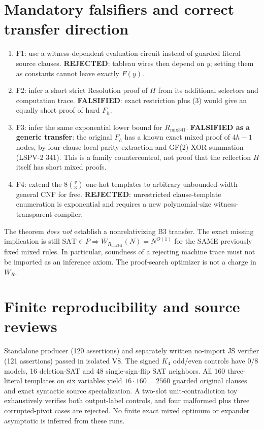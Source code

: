 \documentclass[11pt]{article}
\begin{document}
\section*{Mandatory falsifiers and correct transfer direction}
\begin{enumerate}
\item[] F1: use a witness-dependent evaluation circuit instead of guarded literal source clauses. \textbf{REJECTED}: tableau wires then depend on \(y\); setting them as constants cannot leave exactly \(F(y)\).
\item[] F2: infer a short strict Resolution proof of \(H\) from its additional selectors and computation trace. \textbf{FALSIFIED}: exact restriction plus (3) would give an equally short proof of hard \(F_h\).
\item[] F3: infer the same exponential lower bound for \(R_{\mathrm{mix341}}\). \textbf{FALSIFIED as a generic transfer}: the original \(F_h\) has a known exact mixed proof of \(4h-1\) nodes, by four-clause local parity extraction and GF(2) XOR summation (LSPV-2 341). This is a family countercontrol, not proof that the reflection \(H\) itself has short mixed proofs.
\item[] F4: extend the \(8\binom v3\) one-hot templates to arbitrary unbounded-width general CNF for free. \textbf{REJECTED}: unrestricted clause-template enumeration is exponential and requires a new polynomial-size witness-transparent compiler.
\end{enumerate}
The theorem \emph{does not} establish a nonrelativizing B3 transfer. The exact missing implication is still \(\mathrm{SAT}\in P\Rightarrow\overline W_{R_{\mathrm{mix341}}}(N)=N^{O(1)}\) for the SAME previously fixed mixed rules. In particular, soundness of a rejecting machine trace must not be imported as an inference axiom. The proof-search optimizer is not a charge in \(W_R\).

\section*{Finite reproducibility and source reviews}
Standalone producer (120 assertions) and separately written no-import JS verifier (121 assertions) passed in isolated V8. The signed \(K_4\) odd/even controls have 0/8 models, 16 deletion-SAT and 48 single-sign-flip SAT neighbors. All \(160\) three-literal templates on six variables yield \(16\cdot160=2560\) guarded original clauses and exact syntactic source specialization. A two-slot unit-contradiction toy exhaustively verifies both output-label controls, and four malformed plus three corrupted-pivot cases are rejected. No finite exact mixed optimum or expander asymptotic is inferred from these runs.
\end{document}
